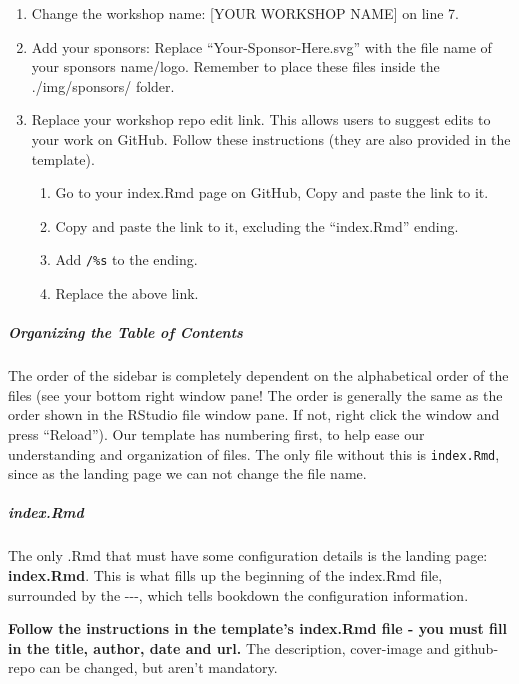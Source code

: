 \documentclass[
]{book}
\providecommand{\tightlist}{%
  \setlength{\itemsep}{0pt}\setlength{\parskip}{0pt}}
\theoremstyle{definition}
\theoremstyle{definition}
\theoremstyle{definition}
\theoremstyle{definition}
\theoremstyle{remark}
\begin{document}
\begin{enumerate}
\def\labelenumi{\arabic{enumi}.}
\item
  Change the workshop name: {[}YOUR WORKSHOP NAME{]} on line 7.
\item
  Add your sponsors: Replace ``Your-Sponsor-Here.svg'' with the file name of your sponsors name/logo. Remember to place these files inside the ./img/sponsors/ folder.
\item
  Replace your workshop repo edit link. This allows users to suggest edits to your work on GitHub. Follow these instructions (they are also provided in the template).

  \begin{enumerate}
  \def\labelenumii{\arabic{enumii}.}
  \tightlist
  \item
    Go to your index.Rmd page on GitHub, Copy and paste the link to it.
  \item
    Copy and paste the link to it, excluding the ``index.Rmd'' ending.
  \item
    Add \texttt{/\%s} to the ending.
  \item
    Replace the above link.
  \end{enumerate}
\end{enumerate}

\subparagraph*{\texorpdfstring{ Organizing the Table of Contents }{ Organizing the Table of Contents }}\label{organizing-the-table-of-contents}

The order of the sidebar is completely dependent on the alphabetical order of the files (see your bottom right window pane! The order is generally the same as the order shown in the RStudio file window pane. If not, right click the window and press ``Reload''). Our template has numbering first, to help ease our understanding and organization of files. The only file without this is \texttt{index.Rmd}, since as the landing page we can not change the file name.

\subparagraph*{\texorpdfstring{ index.Rmd }{ index.Rmd }}\label{index.rmd}

The only .Rmd that must have some configuration details is the landing page: \textbf{index.Rmd}. This is what fills up the beginning of the index.Rmd file, surrounded by the -\/-\/-, which tells bookdown the configuration information.

\textbf{Follow the instructions in the template's index.Rmd file - you must fill in the title, author, date and url.} The description, cover-image and github-repo can be changed, but aren't mandatory.
\end{document}
